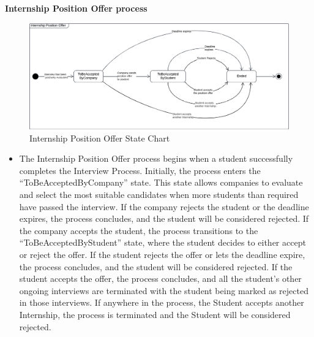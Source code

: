 \noindent\textbf{\color{titleColor}Internship Position Offer process}\\
\begin{figure}[H]
    \centering
    \includegraphics[width=1 \textwidth]{Latex/Images/InternshipPositionOfferStateChart.png}    
    \caption{Internship Position Offer State Chart}
    \label{fig:InternshipPositionOffer}
\end{figure}
\begin{itemize}
    \item The Internship Position Offer process begins when a student successfully completes the Interview Process. Initially, the process enters the “ToBeAcceptedByCompany” state.
    This state allows companies to evaluate and select the most suitable candidates when more students than required have passed the interview.
    If the company rejects the student or the deadline expires, the process concludes, and the student will be considered rejected.
    If the company accepts the student, the process transitions to the “ToBeAcceptedByStudent” state, where the student decides to either accept or reject the offer.
    If the student rejects the offer or lets the deadline expire, the process concludes, and the student will be considered rejected.
    If the student accepts the offer, the process concludes, and all the student’s other ongoing interviews are terminated with the student being marked as rejected in those interviews.
    If anywhere in the process, the Student accepts another Internship, the process is terminated and the Student will be considered rejected.
\end{itemize}

